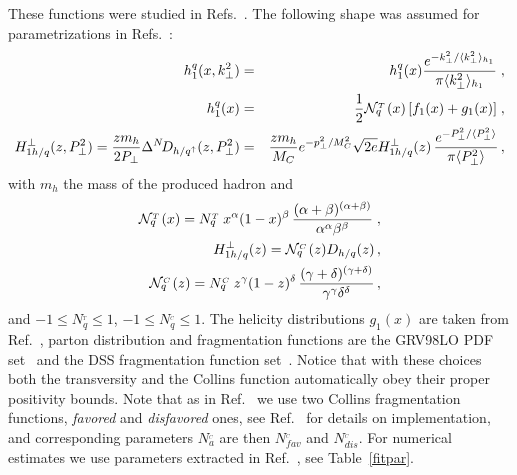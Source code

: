 \documentclass[a4paper,11pt]{article}
\newcommand{\ba}{\begin{eqnarray}}
\newcommand{\ea}{\end{eqnarray}}
\newcommand{\la}{\langle}
\newcommand{\ra}{\rangle}
\def\T{_{_T}}
\def\C{_{_C}}
\def\kperp{k_\perp}
\def\pperp{P_\perp}
\def\avkperp{\la \kperp^2 \ra}
\def\avpperp{\la \pperp^2 \ra}
\begin{document}
These functions were studied in  
Refs.~\cite{Anselmino:2007fs,Anselmino:2008jk,Anselmino:2013vqa,
Kang:2014zza,Kang:2015msa,Anselmino:2015sxa}.
The following shape was assumed for parametrizations in
Refs.~\cite{Anselmino:2007fs,Anselmino:2008jk,Anselmino:2013vqa}:
 \ba
h_{1}^{q} (x, \kperp^2) &=&h_{1}^{q} (x)  \frac{e^{-{\kperp^2}/{\avkperp_{h_1} }}}{\pi \avkperp_{h_1}} \; ,\label{tr-funct}\\
h_{1}^{q} (x) &=&\frac{1}{2} {\cal N}^{\T}_q(x)\,
[f_{1}(x)+g_1(x)]\; ,\\
H_{1 h/q}^{\perp}(z, \pperp^2) = \frac{z m_h}{2 \pperp} \Delta^N \! D_{h/q^\uparrow}(z,\pperp^2) &=&  \frac{z m_h}{M_C} e^{-p_{\perp}^2/M_C^2} \sqrt{2 e} H_{1 h/q}^{\perp}(z) \,\frac{e^{-\pperp^2/{\avpperp}}}{\pi \avpperp}\,,
\label{coll-funct}
 \ea
 with $m_h$ the mass of the produced hadron and
 \ba
 {\cal N}^{\T}_q(x)= N^{\T}_q
\,x^{\alpha} (1-x)^{\beta} \, \frac{(\alpha + \beta)^{(\alpha
+\beta)}} {\alpha^{\alpha} \beta^{\beta}}\; ,
\\
H_{1 h/q}^{\perp}(z) =  {\cal N}^{\C}_q(z) D_{h/q}(z)\, , \\
{\cal N}^{\C}_q(z)= N^{\C}_q \, z^{\gamma} (1-z)^{\delta} \,
\frac{(\gamma + \delta)^{(\gamma +\delta)}}
{\gamma^{\gamma} \delta^{\delta}}\, ,
 \ea
and $-1\le N^{\T}_q\le 1$, $-1 \le N^{\C}_q \le 1$. The helicity distributions $g_1(x)$ are taken
from Ref.~\cite{Gluck:2000dy}, parton distribution and fragmentation functions are the GRV98LO PDF set~\cite{Gluck:1998xa} and the
DSS fragmentation function set~\cite{deFlorian:2007aj}. Notice that with these choices both
the transversity and the Collins function automatically obey their
proper positivity bounds. Note that as in Ref.~\cite{Anselmino:2013vqa} we use two 
Collins fragmentation functions, {\it favored} and {\it disfavored} ones, see Ref.~\cite{Anselmino:2013vqa} for details on implementation, and corresponding parameters ${N}^{\C}_a$ are then  ${N}^{\C}_{fav}$ and ${N}^{\C}_{dis}$. For numerical estimates we use parameters extracted in Ref.~\cite{Anselmino:2013vqa}, see Table~\ref{fitpar}.
\end{document}
